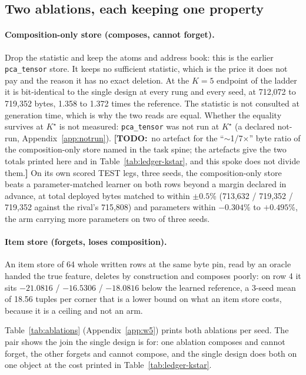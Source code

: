\documentclass{article} %
\newcommand{\TODO}[1]{{\color{orange}\textbf{[TODO:}~#1\textbf{]}}}
\newcommand{\Kstar}{\ensuremath{K^{\star}}}
\begin{document}
\subsection{Two ablations, each keeping one property}
\label{sec:ablations}

\paragraph{Composition-only store (composes, cannot forget).} Drop the statistic and keep the
atoms and address book: this is the earlier \texttt{pca\_tensor} store. It keeps no sufficient
statistic, which is the price it does not pay and the reason it has no exact deletion. At the
$K=5$ endpoint of the ladder it is bit-identical to the single design at every rung and every
seed, at 712,072 to 719,352 bytes, 1.358 to 1.372 times the reference.
The statistic is not consulted at generation time, which is why the two reads are equal.
Whether the equality survives at $\Kstar$ is not measured: \texttt{pca\_tensor} was not run at
$\Kstar$ (a declared not-run, Appendix~\ref{app:notrun}). \TODO{no artefact for the
``$\sim$1/7$\times$'' byte ratio of the composition-only store named in the task spine; the
artefacts give the two totals printed here and in Table~\ref{tab:ledger-kstar}, and this spoke
does not divide them.}
On its own scored TEST legs, three seeds, the composition-only store beats a parameter-matched
learner on both rows beyond a margin declared in advance, at total deployed bytes matched to
within $\pm0.5$\% (713,632 / 719,352 / 719,352 against the rival's 715,808) and parameters within
$-0.304$\% to $+0.495$\%, the arm carrying more parameters on two of three seeds.

\paragraph{Item store (forgets, loses composition).} An item store of 64 whole written rows at
the same byte pin, read by an oracle handed the true feature, deletes by construction and
composes poorly: on row 4 it sits $-21.0816$ / $-16.5306$ / $-18.0816$ below the learned
reference, a 3-seed mean of 18.56 tuples per corner that is a lower bound on what an item store
costs, because it is a ceiling and not an arm. %

Table~\ref{tab:ablations} (Appendix~\ref{app:w5}) prints both ablations per seed. The pair shows
the join the single design is for: one ablation composes and cannot
forget, the other forgets and cannot compose, and the single design does both on one object at
the cost printed in Table~\ref{tab:ledger-kstar}.
\end{document}
